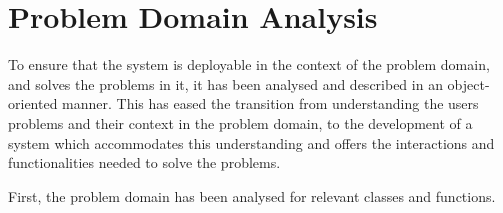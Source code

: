 \chapter{Problem Domain Analysis}\label{ch:problemdomain}
To ensure that the system is deployable in the context of the problem domain, and solves the problems in it, it has been analysed and described in an object-oriented manner. This has eased the transition from understanding the users problems and their context in the problem domain, to the development of a system which accommodates this understanding and offers the interactions and functionalities needed to solve the problems.
\par
First, the problem domain has been analysed for relevant classes and functions. 